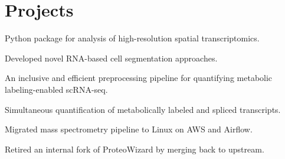 \documentclass[]{resume}
\begin{document}
\begin{minipage}[t]{0.69\textwidth}


\section{Projects}

\vspace{\topsep} %
\begin{tightemize}
\item {Python package for analysis of high-resolution spatial transcriptomics.}
\item {Developed novel RNA-based cell segmentation approaches.}
\end{tightemize}
\sectionsep

\begin{tightemize}
\item {An inclusive and efficient preprocessing pipeline for quantifying metabolic labeling-enabled scRNA-seq.}
\item {Simultaneous quantification of metabolically labeled and spliced transcripts.}
\end{tightemize}
\sectionsep

\begin{tightemize}
\item {Migrated mass spectrometry pipeline to Linux on AWS and Airflow.}
\item {Retired an internal fork of ProteoWizard by merging back to upstream.}
\end{tightemize}
\sectionsep



\end{minipage}
\end{document}
